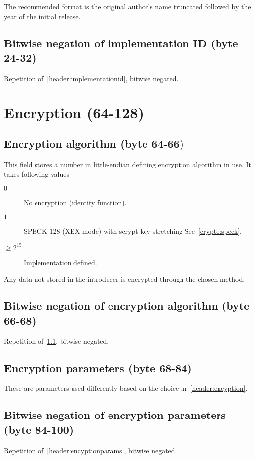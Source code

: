 \documentclass[11pt,a4paper]{report}
\begin{document}
        The recommended format is the original author's name truncated
        followed by the year of the initial release.

        \subsection{Bitwise negation of implementation ID (byte 24-32)}
        Repetition of~\ref{header:implementationid}, bitwise negated.

    \section{Encryption (64-128)}
        \subsection{Encryption algorithm (byte 64-66)}
        \label{header:encryption}
        This field stores a number in little-endian defining encryption
        algorithm in use. It takes following values

        \begin{description}
            \item [$0$] No encryption (identity function).
            \item [$1$] SPECK-128 (XEX mode) with scrypt key stretching
                See~\ref{crypto:speck}.
            \item [$\geq 2^{15}$] Implementation defined.
        \end{description}

        Any data not stored in the introducer is encrypted through the chosen method.

        \subsection{Bitwise negation of encryption algorithm (byte 66-68)}
        Repetition of~\ref{header:encryption}, bitwise negated.

        \subsection{Encryption parameters (byte 68-84)}
        \label{header:encryptionparams}
        These are parameters used differently based on the choice
        in~\ref{header:encyption}.

        \subsection{Bitwise negation of encryption parameters (byte 84-100)}
        Repetition of~\ref{header:encyptionparams}, bitwise negated.
\end{document}
